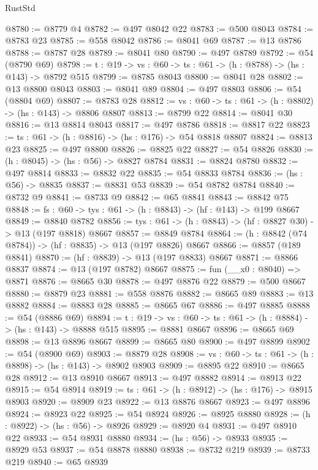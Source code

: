 \begin{lexlean}{RustStd}
\begin{coremodule}
@8780 := @8779 @4
@8782 := @497 @8042 @22
@8783 := @500 @8043
@8784 := @8783 @23
@8785 := @558 @8042
@8786 := @8041 @69
@8787 := @13 @8786
@8788 := @8787 @28
@8789 := @8041 @80
@8790 := @497 @8789
@8792 := @54 (@8790 @69)
@8798 := {t : @19} -> {vs : @60} -> {ts : @61} -> (h : @8788) -> (hs : @143) -> @8792 @515
@8799 := @8785 @8043
@8800 := @8041 @28
@8802 := @13 @8800 @8043
@8803 := @8041 @89
@8804 := @497 @8803
@8806 := @54 (@8804 @69)
@8807 := @8783 @28
@8812 := {vs : @60} -> {ts : @61} -> (h : @8802) -> (hs : @143) -> @8806 @8807
@8813 := @8799 @22
@8814 := @8041 @30
@8816 := @13 @8814 @8043
@8817 := @497 @8786
@8818 := @8817 @22
@8823 := {ts : @61} -> (h : @8816) -> (hs : @176) -> @54 @8818 @8807
@8824 := @8813 @23
@8825 := @497 @8800
@8826 := @8825 @22
@8827 := @54 @8826
@8830 := (h : @8045) -> (hs : @56) -> @8827 @8784
@8831 := @8824 @8780
@8832 := @497 @8814
@8833 := @8832 @22
@8835 := @54 @8833 @8784
@8836 := (hs : @56) -> @8835
@8837 := @8831 @53
@8839 := @54 @8782 @8784
@8840 := @8732 @9
@8841 := @8733 @9
@8842 := @65 @8841
@8843 := @8842 @75
@8848 := {fs : @60} -> {tys : @61} -> (h : @8843) -> (hf : @143) -> @199 @8667
@8849 := @8840 @8782
@8856 := {tys : @61} -> (h : @8843) -> (hf : @8827 @30) -> @13 (@197 @8818) @8667
@8857 := @8849 @8784
@8864 := (h : @8842 (@74 @8784)) -> (hf : @8835) -> @13 (@197 @8826) @8667
@8866 := @8857 (@189 @8841)
@8870 := (hf : @8839) -> @13 (@197 @8833) @8667
@8871 := @8866 @8837
@8874 := @13 (@197 @8782) @8667
@8875 := fun (__x0 : @8040) => @8871
@8876 := @8665 @30
@8878 := @497 @8876 @22
@8879 := @500 @8667
@8880 := @8879 @23
@8881 := @558 @8876
@8882 := @8665 @89
@8883 := @13 @8882
@8884 := @8883 @28
@8885 := @8665 @67
@8886 := @497 @8885
@8888 := @54 (@8886 @69)
@8894 := {t : @19} -> {vs : @60} -> {ts : @61} -> (h : @8884) -> (hs : @143) -> @8888 @515
@8895 := @8881 @8667
@8896 := @8665 @69
@8898 := @13 @8896 @8667
@8899 := @8665 @80
@8900 := @497 @8899
@8902 := @54 (@8900 @69)
@8903 := @8879 @28
@8908 := {vs : @60} -> {ts : @61} -> (h : @8898) -> (hs : @143) -> @8902 @8903
@8909 := @8895 @22
@8910 := @8665 @28
@8912 := @13 @8910 @8667
@8913 := @497 @8882
@8914 := @8913 @22
@8915 := @54 @8914
@8919 := {ts : @61} -> (h : @8912) -> (hs : @176) -> @8915 @8903
@8920 := @8909 @23
@8922 := @13 @8876 @8667
@8923 := @497 @8896
@8924 := @8923 @22
@8925 := @54 @8924
@8926 := @8925 @8880
@8928 := (h : @8922) -> (hs : @56) -> @8926
@8929 := @8920 @4
@8931 := @497 @8910 @22
@8933 := @54 @8931 @8880
@8934 := (hs : @56) -> @8933
@8935 := @8929 @53
@8937 := @54 @8878 @8880
@8938 := @8732 @219
@8939 := @8733 @219
@8940 := @65 @8939

\end{coremodule}
\end{lexlean}
